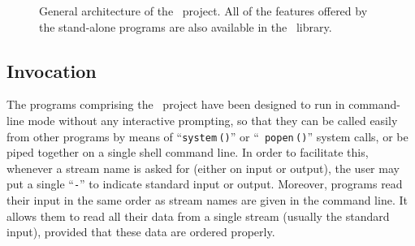 \begin{figure}[p]
\caption{General architecture of the \scotch\ project. All of the
features offered by the stand-alone programs are also available in
the \libscotch\ library.}
\label{fig-synp}
\end{figure}

\subsection{Invocation}

The programs comprising the \scotch\ project have been designed to run in
command-line mode without any interactive prompting,
so that they can be called easily from other programs by means of
``\mbox{\texttt{system$\,$()}}'' or ``\mbox{\texttt{ popen$\,$()}}''
system calls, or be piped together on a single shell command line. In
order to facilitate this, whenever a stream name is asked for (either
on input or output), the user may put a single ``\texttt{-}'' to
indicate standard input or output. Moreover, programs read their input
in the same order as stream names are given in the command line. It
allows them to read all their data from a single stream (usually the
standard input), provided that these data are ordered properly.

